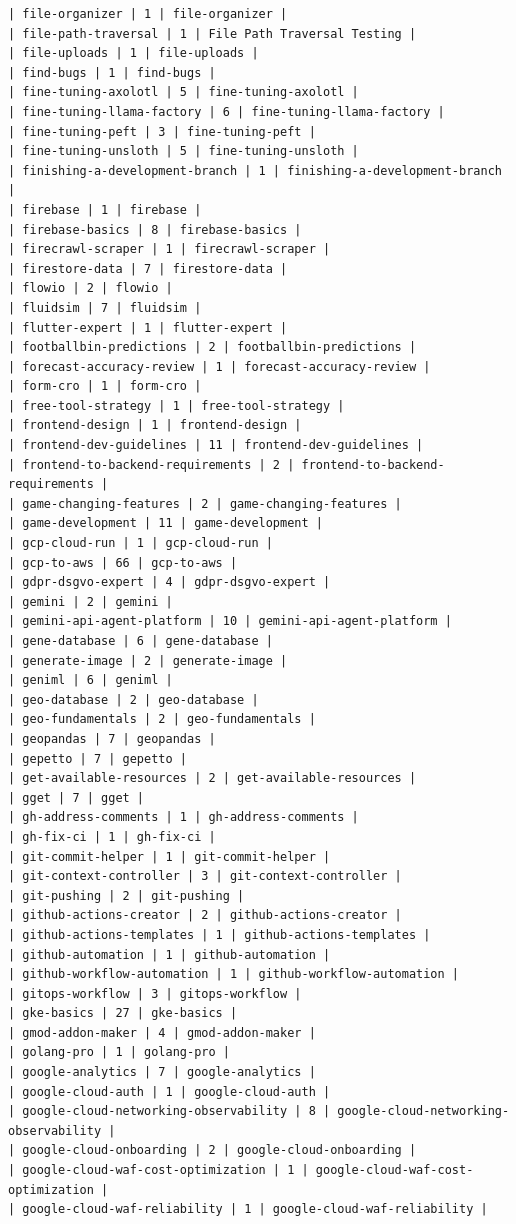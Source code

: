 \begin{Verbatim}[breaklines,breakanywhere,fontsize=\footnotesize]
| file-organizer | 1 | file-organizer |
| file-path-traversal | 1 | File Path Traversal Testing |
| file-uploads | 1 | file-uploads |
| find-bugs | 1 | find-bugs |
| fine-tuning-axolotl | 5 | fine-tuning-axolotl |
| fine-tuning-llama-factory | 6 | fine-tuning-llama-factory |
| fine-tuning-peft | 3 | fine-tuning-peft |
| fine-tuning-unsloth | 5 | fine-tuning-unsloth |
| finishing-a-development-branch | 1 | finishing-a-development-branch |
| firebase | 1 | firebase |
| firebase-basics | 8 | firebase-basics |
| firecrawl-scraper | 1 | firecrawl-scraper |
| firestore-data | 7 | firestore-data |
| flowio | 2 | flowio |
| fluidsim | 7 | fluidsim |
| flutter-expert | 1 | flutter-expert |
| footballbin-predictions | 2 | footballbin-predictions |
| forecast-accuracy-review | 1 | forecast-accuracy-review |
| form-cro | 1 | form-cro |
| free-tool-strategy | 1 | free-tool-strategy |
| frontend-design | 1 | frontend-design |
| frontend-dev-guidelines | 11 | frontend-dev-guidelines |
| frontend-to-backend-requirements | 2 | frontend-to-backend-requirements |
| game-changing-features | 2 | game-changing-features |
| game-development | 11 | game-development |
| gcp-cloud-run | 1 | gcp-cloud-run |
| gcp-to-aws | 66 | gcp-to-aws |
| gdpr-dsgvo-expert | 4 | gdpr-dsgvo-expert |
| gemini | 2 | gemini |
| gemini-api-agent-platform | 10 | gemini-api-agent-platform |
| gene-database | 6 | gene-database |
| generate-image | 2 | generate-image |
| geniml | 6 | geniml |
| geo-database | 2 | geo-database |
| geo-fundamentals | 2 | geo-fundamentals |
| geopandas | 7 | geopandas |
| gepetto | 7 | gepetto |
| get-available-resources | 2 | get-available-resources |
| gget | 7 | gget |
| gh-address-comments | 1 | gh-address-comments |
| gh-fix-ci | 1 | gh-fix-ci |
| git-commit-helper | 1 | git-commit-helper |
| git-context-controller | 3 | git-context-controller |
| git-pushing | 2 | git-pushing |
| github-actions-creator | 2 | github-actions-creator |
| github-actions-templates | 1 | github-actions-templates |
| github-automation | 1 | github-automation |
| github-workflow-automation | 1 | github-workflow-automation |
| gitops-workflow | 3 | gitops-workflow |
| gke-basics | 27 | gke-basics |
| gmod-addon-maker | 4 | gmod-addon-maker |
| golang-pro | 1 | golang-pro |
| google-analytics | 7 | google-analytics |
| google-cloud-auth | 1 | google-cloud-auth |
| google-cloud-networking-observability | 8 | google-cloud-networking-observability |
| google-cloud-onboarding | 2 | google-cloud-onboarding |
| google-cloud-waf-cost-optimization | 1 | google-cloud-waf-cost-optimization |
| google-cloud-waf-reliability | 1 | google-cloud-waf-reliability |

\end{Verbatim}
